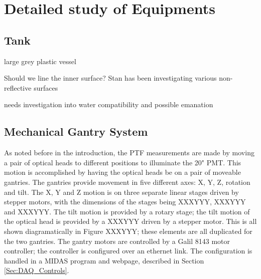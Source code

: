 \section{Detailed study of Equipments}





\subsection{Tank}



large grey plastic vessel

Should we line the inner surface? Stan has been investigating various
non-reflective surfaces

needs investigation into water compatibility and possible emanation





\subsection{Mechanical Gantry System}


As noted before in the introduction, the PTF measurements are made by moving a pair of optical heads to
different positions to illuminate the 20" PMT.  This motion is accomplished by having the optical heads be on
a pair of moveable gantries.  The gantries provide movement in five different axes: X, Y, Z, rotation and tilt.
The X, Y and Z motion is on three separate linear stages driven by stepper motors,
with the dimensions of the stages being XXXYYY, XXXYYY
and XXXYYY.  The tilt motion is provided by a rotary stage; the tilt motion of the optical head is
provided by a XXXYYY driven by a stepper motor.
This is all shown diagramatically in Figure XXXYYY; these elements are all duplicated for
the two gantries.  The gantry motors are controlled by a Galil 8143 motor controller; the controller is configured
over an ethernet link.  The configuration is handled in a MIDAS program and webpage, described in Section
\ref{Sec:DAQ_Controls}.

